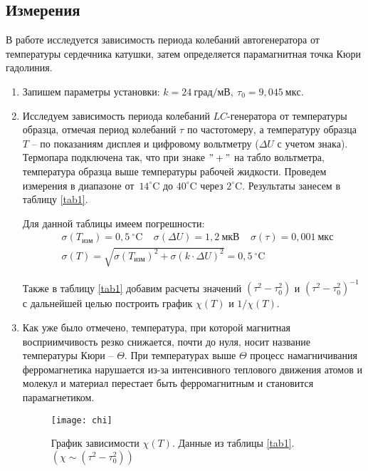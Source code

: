 \documentclass{lab}
\newcommand{\Cd}{^{\circ}\mathrm{C}}
\begin{document}
\subsection*{Измерения}
\hspace*{\parindent}
В работе исследуется зависимость периода колебаний автогенератора от температуры сердечника
катушки, затем определяется парамагнитная точка Кюри гадолиния.

\begin{enumerate}
\item
Запишем параметры установки: $ k = 24 ~ град/мВ, ~ \tau_0 = 9,045 ~ мкс $.

\item
Исследуем зависимость периода колебаний $ LC $-генератора от температуры образца, отмечая
период колебаний $ \tau $ по частотомеру, а температуру образца $ T $ -- по показаниям дисплея и
цифровому вольтметру ($ \Delta U $ с учетом знака). Термопара подключена так, что при знаке
$ "+" $ на табло вольтметра, температура образца выше температуры рабочей жидкости. Проведем
измерения в диапазоне от~$ 14 \Cd $ до $ 40 \Cd $ через $ 2 \Cd $. Результаты занесем в таблицу
\ref{tab1}.

Для данной таблицы имеем погрешности:
\begin{equation}
\begin{aligned}
&\sigma(T_{изм}) = 0,5~\Cd ~~~~~ \sigma(\Delta U) = 1,2~мкВ ~~~~~ \sigma(\tau) = 0,001~мкс	\\
&\sigma(T) = \sqrt{\sigma(T_{изм})^2 + \sigma(k \cdot \Delta U)^2} = 0,5~\Cd
\end{aligned}
\end{equation}

Также в таблицу \ref{tab1} добавим расчеты значений $ (\tau^2 - \tau_0^2) $ и
$ (\tau^2 - \tau_0^2)^{-1} $ с дальнейшей целью построить график $ \chi(T) $ и $ 1/\chi(T) $.


\item
Как уже было отмечено, температура, при которой магнитная восприимчивость резко снижается, почти
до нуля, носит название температуры Кюри -- $ \Theta $. При температурах выше $ \Theta $ процесс
намагничивания ферромагнетика нарушается из-за интенсивного теплового движения атомов и молекул
и материал перестает быть ферромагнитным и становится парамагнетиком.

\begin{figure}[H]
	\centering
	\texttt{[image: chi]}
	\caption{\footnotesize
		График зависимости $ \chi(T) $. Данные из таблицы \ref{tab1}.\\
		$ \left( \chi \sim (\tau^2 - \tau_0^2) \right) $
	}
	\label{chi}
\end{figure}


\end{enumerate}
\end{document}
